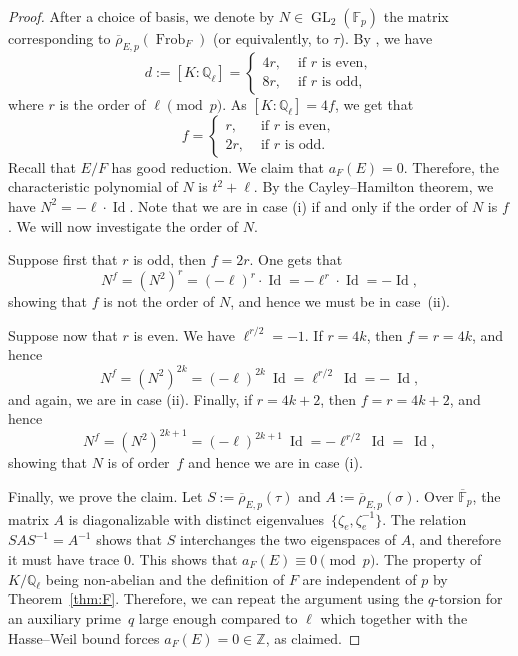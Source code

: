 \documentclass[12pt]{amsart}
\numberwithin{equation}{section}
\theoremstyle{definition}
\newcommand{\F}{\mathbb{F}}
\newcommand{\Q}{\mathbb{Q}}
\newcommand{\Z}{\mathbb{Z}}
\newcommand{\rhobar}{{\overline{\rho}}}
\DeclareMathOperator{\GL}{GL}
\DeclareMathOperator{\Frob}{Frob}
\DeclareMathOperator{\Id}{Id}
\begin{document}
\begin{proof}
After a choice of basis, we denote by $N\in \GL_2(\F_p)$ the matrix corresponding to  $\rhobar_{E,p}(\Frob_F)$ (or equivalently, to $\tau$).
 By \cite[Theorem 4.11]{torsf}, we have
    \begin{equation}\label{eq:d}
d:=[K:\Q_\ell]=\begin{cases}
    4r, & \text{ if }r \text{ is even},\\
    8r, & \text{ if }r \text{ is odd},
\end{cases}
    \end{equation}
    where $r$ is the order of $\ell \pmod p$. As
    $[K:\Q_\ell]=4f$, we get that 
     \[
f=\begin{cases}
    r, & \text{ if }r \text{ is even},\\
    2r, & \text{ if }r \text{ is odd}.
\end{cases}
    \]
    Recall that $E/F$ has good reduction. We claim that $a_F(E)=0$. Therefore, the characteristic
    polynomial of $N$ is $t^2+\ell$.
By the Cayley--Hamilton theorem, we have $N^2=-\ell \cdot\Id$.
Note that we are in case (i) if and only if the order of $N$ is $f$. We will now investigate the order of $N$.

Suppose first that $r$ is odd, then $f=2r$. One gets that 
\[
N^f=(N^2)^r=(-\ell)^r \cdot\Id=-\ell^r\cdot\Id= -\Id,
\]
showing that $f$ is not the order of $N$, and hence we must be
in case~(ii).

Suppose now that $r$ is even. We have $\ell^{r/2}=-1$.
If $r=4k$, then $f=r=4k$, and hence
\[
N^f= (N^2)^{2k}=(-\ell)^{2k}\:\Id= \ell^{r/2} \:\Id =- \:\Id,
\]
and again, we are in case (ii).
Finally, if $r=4k+2$, then $f=r=4k+2$, and hence 
\[
N^f= (N^2)^{2k+1}=(-\ell)^{2k+1}\:\Id= -\ell^{r/2} \:\Id = \:\Id,
\]
showing that $N$ is of order~$f$ and hence we are in case (i).

Finally, we prove the claim.
Let $S:=\rhobar_{E,p}(\tau)$ and $A:=\rhobar_{E,p}(\sigma)$. 
Over $\overline{\F}_p$, the matrix $A$ is
diagonalizable with distinct eigenvalues~$\{\zeta_e, \zeta_e^{-1}\}$. The relation
$SAS^{-1}=A^{-1}$ shows that $S$ interchanges the two eigenspaces of $A$, and therefore it must have trace $0$. 
This shows that $a_F(E) \equiv 0 \pmod{p}$. The property of $K/\Q_\ell$ being non-abelian and the definition of $F$ are independent of $p$ by Theorem~\ref{thm:F}. Therefore, we can repeat the argument using the $q$-torsion for an auxiliary prime~$q$ large enough compared to $\ell$ which together with the Hasse--Weil bound forces $a_F(E) = 0 \in \Z$, as claimed. 
\end{proof}
\end{document}
